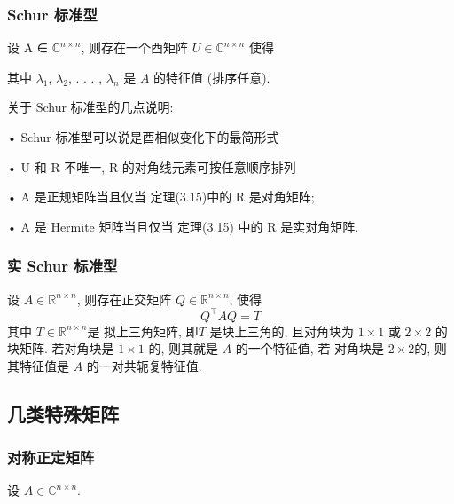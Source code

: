 \documentclass[12pt,a4paper]{article}
\begin{document}
\subsubsection{Schur 标准型}
\begin{framed}
	\begin{theorem}
		设 A ∈ $\mathbb{C}^{n×n}$, 则存在一个酉矩阵 $U ∈\mathbb{C}^{n×n}$ 使得	
	
	其中 $\lambda_1$, $\lambda_2$, . . . , $\lambda_n$ 是 $A$ 的特征值 (排序任意).
	\end{theorem}
\end{framed}

关于 Schur 标准型的几点说明:

• Schur 标准型可以说是酉相似变化下的最简形式

• U 和 R 不唯一, R 的对角线元素可按任意顺序排列

• A 是正规矩阵当且仅当 定理(3.15)中的 R 是对角矩阵;

• A 是 Hermite 矩阵当且仅当 定理(3.15) 中的 R 是实对角矩阵.

\subsubsection{实 Schur 标准型}
\begin{framed}
	\begin{theorem}
		设 $A ∈ \mathbb{R}^{n×n}$, 则存在正交矩阵 $Q ∈ \mathbb{R}^{n×n}$, 使得
		$$
		Q^{\top} A Q=T
		$$
		其中 $T ∈ \mathbb{R}^{n×n}$是 拟上三角矩阵, 即$ T$ 是块上三角的, 且对角块为 $1 × 1$
		或 $2 × 2$ 的块矩阵. 若对角块是 $1 × 1$ 的, 则其就是 $A$ 的一个特征值, 若
		对角块是 $2 × 2 $的, 则其特征值是 $A$ 的一对共轭复特征值.
	\end{theorem}
\end{framed}

\subsection{几类特殊矩阵}

\subsubsection{对称正定矩阵}
设 $A ∈ \mathbb{C}^{n×n}$.
\end{document}
